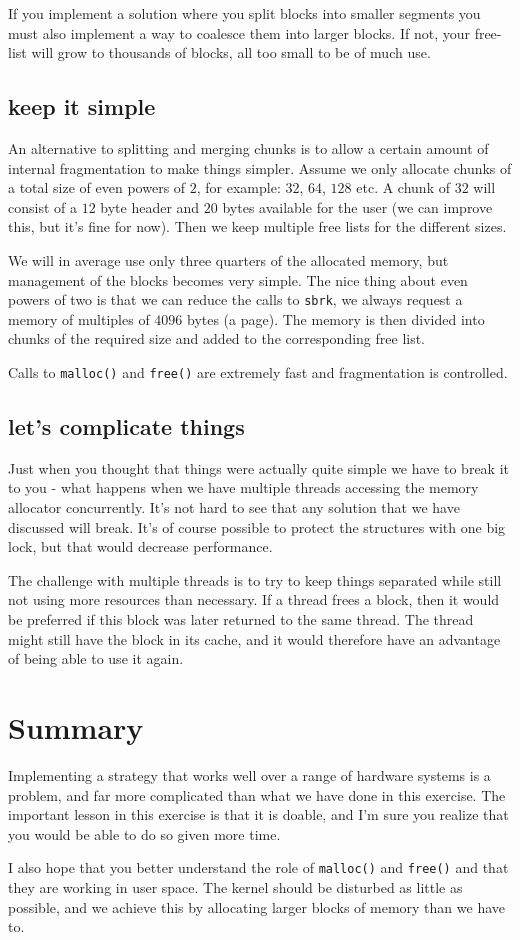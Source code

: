 \documentclass[a4paper,11pt]{article}
\begin{document}
If you implement a solution where you split blocks into smaller
segments you must also implement a way to coalesce them into larger
blocks. If not, your free-list will grow to thousands of blocks, all
too small to be of much use. 

\subsection{keep it simple}

An alternative to splitting and merging chunks is to allow a certain
amount of internal fragmentation to make things simpler. Assume we
only allocate chunks of a total size of even powers of $2$, for example:
$32$, $64$, $128$ etc. A chunk of $32$ will consist of a $12$ byte
header and $20$ bytes available for the user (we can improve this, but
it's fine for now). Then we keep multiple free lists for the different
sizes. 

We will in average use only three quarters of the allocated memory, but
management of the blocks becomes very simple. The nice thing about
even powers of two is that we can reduce the calls to {\tt sbrk}, we
always request a memory of multiples of $4096$ bytes (a page). The
memory is then divided into chunks of the required size and added to
the corresponding free list.

Calls to {\tt malloc()} and {\tt free()} are extremely fast and
fragmentation is controlled.

\subsection{let's complicate things}

Just when you thought that things were actually quite simple we have to
break it to you - what happens when we have multiple threads accessing
the memory allocator concurrently. It's not hard to see that any
solution that we have discussed will break. It's of course possible to
protect the structures with one big lock, but that would decrease performance. 

The challenge with multiple threads is to try to keep things separated
while still not using more resources than necessary. If a thread frees a
block, then it would be preferred if this block was later returned to
the same thread. The thread might still have the block in its cache, and
it would therefore have an advantage of being able to use it again. 

\section{Summary}

Implementing a strategy that works well over a range of hardware
systems is a problem, and far more complicated than what we have done
in this exercise. The important lesson in this exercise is that it is
doable, and I'm sure you realize that you would be able to do so given
more time.

I also hope that you better understand the role of {\tt malloc()} and
{\tt free()} and that they are working in user space. The kernel
should be disturbed as little as possible, and we achieve this by
allocating larger blocks of memory than we have to.
\end{document}
